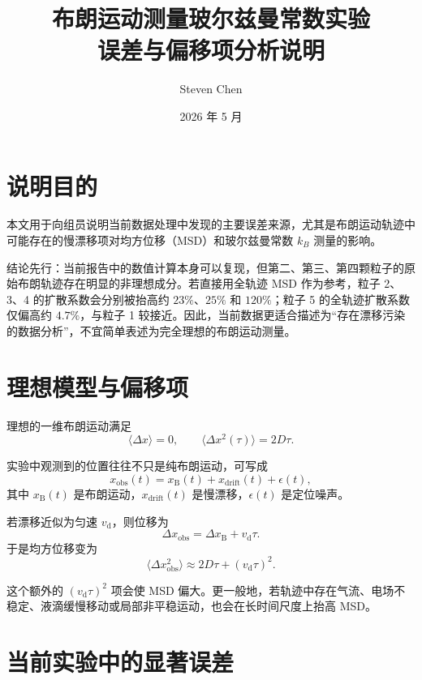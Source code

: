 \documentclass[12pt,a4paper]{ctexart}
\title{\textbf{布朗运动测量玻尔兹曼常数实验\\误差与偏移项分析说明}}
\author{Steven Chen}
\date{2026 年 5 月}
\begin{document}
\maketitle

\section{说明目的}

本文用于向组员说明当前数据处理中发现的主要误差来源，尤其是布朗运动轨迹中可能存在的慢漂移项对均方位移（MSD）和玻尔兹曼常数 $k_B$ 测量的影响。

结论先行：当前报告中的数值计算本身可以复现，但第二、第三、第四颗粒子的原始布朗轨迹存在明显的非理想成分。若直接用全轨迹 MSD 作为参考，粒子 2、3、4 的扩散系数会分别被抬高约 $23\%$、$25\%$ 和 $120\%$；粒子 5 的全轨迹扩散系数仅偏高约 $4.7\%$，与粒子 1 较接近。因此，当前数据更适合描述为“存在漂移污染的数据分析”，不宜简单表述为完全理想的布朗运动测量。

\section{理想模型与偏移项}

理想的一维布朗运动满足
\begin{equation}
  \langle \Delta x \rangle = 0, \qquad
  \langle \Delta x^2(\tau) \rangle = 2D\tau .
\end{equation}

实验中观测到的位置往往不只是纯布朗运动，可写成
\begin{equation}
  x_{\mathrm{obs}}(t)=x_{\mathrm{B}}(t)+x_{\mathrm{drift}}(t)+\epsilon(t),
\end{equation}
其中 $x_{\mathrm{B}}(t)$ 是布朗运动，$x_{\mathrm{drift}}(t)$ 是慢漂移，$\epsilon(t)$ 是定位噪声。

若漂移近似为匀速 $v_{\mathrm{d}}$，则位移为
\begin{equation}
  \Delta x_{\mathrm{obs}} = \Delta x_{\mathrm{B}} + v_{\mathrm{d}}\tau .
\end{equation}
于是均方位移变为
\begin{equation}
  \langle \Delta x_{\mathrm{obs}}^2 \rangle
  \approx 2D\tau + (v_{\mathrm{d}}\tau)^2 .
\end{equation}

这个额外的 $(v_{\mathrm{d}}\tau)^2$ 项会使 MSD 偏大。更一般地，若轨迹中存在气流、电场不稳定、液滴缓慢移动或局部非平稳运动，也会在长时间尺度上抬高 MSD。

\section{当前实验中的显著误差}
\end{document}
